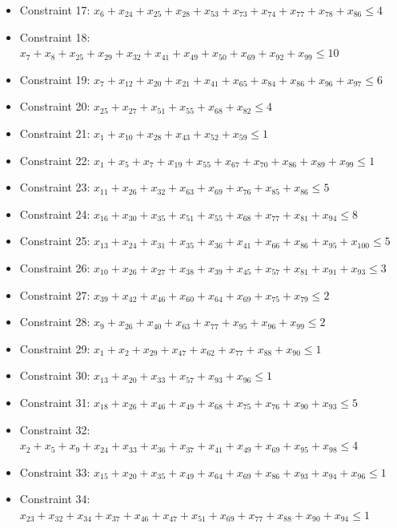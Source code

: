 \documentclass[11pt]{article}
\begin{document}
\begin{itemize}
\item Constraint 17: $x_{6} + x_{24} + x_{25} + x_{28} + x_{53} + x_{73} + x_{74} + x_{77} + x_{78} + x_{86} \le 4$
\item Constraint 18: $x_{7} + x_{8} + x_{25} + x_{29} + x_{32} + x_{41} + x_{49} + x_{50} + x_{69} + x_{92} + x_{99} \le 10$
\item Constraint 19: $x_{7} + x_{12} + x_{20} + x_{21} + x_{41} + x_{65} + x_{84} + x_{86} + x_{96} + x_{97} \le 6$
\item Constraint 20: $x_{25} + x_{27} + x_{51} + x_{55} + x_{68} + x_{82} \le 4$
\item Constraint 21: $x_{1} + x_{10} + x_{28} + x_{43} + x_{52} + x_{59} \le 1$
\item Constraint 22: $x_{1} + x_{5} + x_{7} + x_{19} + x_{55} + x_{67} + x_{70} + x_{86} + x_{89} + x_{99} \le 1$
\item Constraint 23: $x_{11} + x_{26} + x_{32} + x_{63} + x_{69} + x_{76} + x_{85} + x_{86} \le 5$
\item Constraint 24: $x_{16} + x_{30} + x_{35} + x_{51} + x_{55} + x_{68} + x_{77} + x_{81} + x_{94} \le 8$
\item Constraint 25: $x_{13} + x_{24} + x_{31} + x_{35} + x_{36} + x_{41} + x_{66} + x_{86} + x_{95} + x_{100} \le 5$
\item Constraint 26: $x_{10} + x_{26} + x_{27} + x_{38} + x_{39} + x_{45} + x_{57} + x_{81} + x_{91} + x_{93} \le 3$
\item Constraint 27: $x_{39} + x_{42} + x_{46} + x_{60} + x_{64} + x_{69} + x_{75} + x_{79} \le 2$
\item Constraint 28: $x_{9} + x_{26} + x_{40} + x_{63} + x_{77} + x_{95} + x_{96} + x_{99} \le 2$
\item Constraint 29: $x_{1} + x_{2} + x_{29} + x_{47} + x_{62} + x_{77} + x_{88} + x_{90} \le 1$
\item Constraint 30: $x_{13} + x_{20} + x_{33} + x_{57} + x_{93} + x_{96} \le 1$
\item Constraint 31: $x_{18} + x_{26} + x_{46} + x_{49} + x_{68} + x_{75} + x_{76} + x_{90} + x_{93} \le 5$
\item Constraint 32: $x_{2} + x_{5} + x_{9} + x_{24} + x_{33} + x_{36} + x_{37} + x_{41} + x_{49} + x_{69} + x_{95} + x_{98} \le 4$
\item Constraint 33: $x_{15} + x_{20} + x_{35} + x_{49} + x_{64} + x_{69} + x_{86} + x_{93} + x_{94} + x_{96} \le 1$
\item Constraint 34: $x_{23} + x_{32} + x_{34} + x_{37} + x_{46} + x_{47} + x_{51} + x_{69} + x_{77} + x_{88} + x_{90} + x_{94} \le 1$

\end{itemize}
\end{document}
